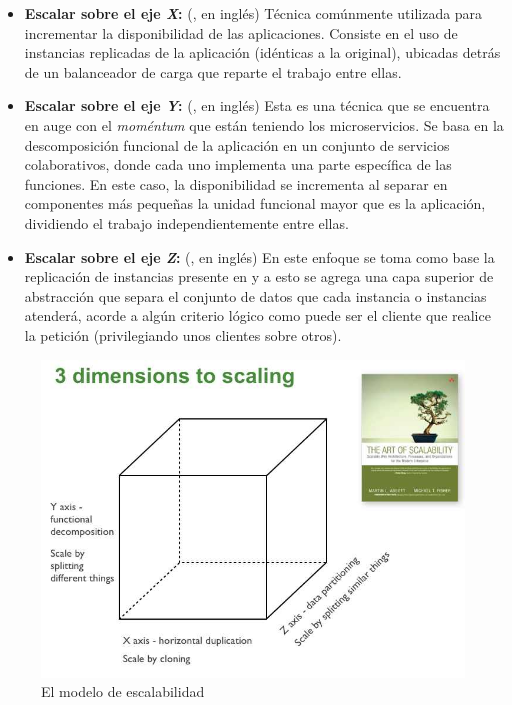 \begin{itemize}
  \item \textbf{Escalar sobre el eje \textit{X}:} (, en inglés) Técnica comúnmente utilizada para incrementar la disponibilidad de las aplicaciones. Consiste en el uso de instancias replicadas de la aplicación (idénticas a la original), ubicadas detrás de un balanceador de carga que reparte el trabajo entre ellas.
  \item \textbf{Escalar sobre el eje \textit{Y}:} (, en inglés) Esta es una técnica que se encuentra en auge con el \textit{moméntum} que están teniendo los microservicios. Se basa en la descomposición funcional de la aplicación en un conjunto de servicios colaborativos, donde cada uno implementa una parte específica de las funciones. En este caso, la disponibilidad se incrementa al separar en componentes más pequeñas la unidad funcional mayor que es la aplicación, dividiendo el trabajo independientemente entre ellas.
  \item \textbf{Escalar sobre el eje \textit{Z}:} (, en inglés) En este enfoque se toma como base la replicación de instancias presente en  y a esto se agrega una capa superior de abstracción que separa el conjunto de datos que cada instancia o instancias atenderá, acorde a algún criterio lógico como puede ser el cliente que realice la petición (privilegiando unos clientes sobre otros).
\end{itemize}

\begin{figure}[H]
  \includegraphics[width=\linewidth]{src/images/04-capitulo-4/scale_cube.jpg}
  \caption{El modelo de escalabilidad }
  \label{fig:scale-cube}
\end{figure}

